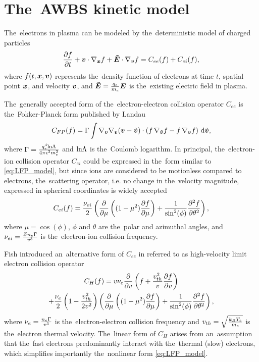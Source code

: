 \section{The~AWBS kinetic model}
\label{sec:AWBSmodel}

The~electrons in plasma can be modeled by the~deterministic model of charged
particles
\begin{equation}
  \frac{\partial{f}}{\partial{t}} + \boldsymbol{v}\cdot\nabla_{\boldsymbol{x}} f + \boldsymbol{\tilde{E}} \cdot\nabla_{\boldsymbol{v}} f = C_{ee}(f) + C_{ei}(f) ,
  \label{eq:kinetic_equation}
\end{equation}
where $f(t, \boldsymbol{x}, \boldsymbol{v})$ represents the~density function of electrons
at time $t$, spatial point $\boldsymbol{x}$, and velocity $\boldsymbol{v}$, and 
$\boldsymbol{\tilde{E}} = \frac{q_e}{m_e}\boldsymbol{E}$ is the~existing electric field in plasma.

The~generally accepted form of the~electron-electron collision operator 
$C_{ee}$ is the~Fokker-Planck form published by Landau \cite{Landau_1936}
\begin{equation}
  C_{FP}(f) =
  \Gamma\int \nabla_{\boldsymbol{v}}\nabla_{\boldsymbol{v}}(\boldsymbol{v} - \tilde{\boldsymbol{v}}) \cdot \left(
  f\, \nabla_{\tilde{\boldsymbol{v}}} f - f\, \nabla_{\boldsymbol{v}} f \right)\, \text{d}\tilde{\boldsymbol{v}} ,
  \label{eq:LFP_model}
\end{equation}
where $\Gamma = \frac{q_e^4\text{ln}\Lambda}{4\pi\epsilon^2m_e^2}$ and 
$\text{ln}\Lambda$ is the~Coulomb logarithm.
In principal, the~electron-ion collision operator $C_{ei}$ could be expressed
in the~form similar to \eqref{eq:LFP_model}, but since ions are considered 
to be motionless compared to electrons, the~scattering operator, i.e.
no change in the~velocity magnitude, expressed in spherical coordinates
is widely accepted
\begin{equation}
  C_{ei}(f) = \frac{\nu_{ei}}{2}
  \left(\frac{\partial{}}{\partial{\mu}}\left((1 - \mu^2)\frac{\partial{f}}{\partial{\mu}}\right)
  + \frac{1}{\sin^2(\phi)}\frac{\partial^2 f}{\partial\theta^2} \right) ,
  \label{eq:ei_scattering}
\end{equation}
where $\mu = \cos(\phi)$, $\phi$ and $\theta$ are the~polar and azimuthal 
angles, and $\nu_{ei} = \frac{Z n_e \Gamma}{v^3}$ is the~electron-ion
collision frequency.

Fish introduced an~alternative form of $C_{ee}$ in \cite{Fish_RMP1987} 
referred to as high-velocity limit electron collision operator
\begin{multline}
  C_{H}(f) = v \nu_{e} \frac{\partial{}}{\partial{v}}\left(f + 
  \frac{v_{th}^2}{v}\frac{\partial{f}}{\partial{v}}\right) \\
  + \frac{\nu_{e}}{2}\left( 1 - \frac{v_{th}^2}{2v^2}\right) 
  \left(\frac{\partial{}}{\partial{\mu}}\left((1 - \mu^2)\frac{\partial{f}}{\partial{\mu}}\right)
  + \frac{1}{\sin^2(\phi)}\frac{\partial^2f}{\partial\theta^2} \right)
  , \label{eq:HighVelocity_model}
\end{multline}
where $\nu_{e} = \frac{n_e \Gamma}{v^3}$ is the~electron-electron collision 
frequency and $v_{th} = \sqrt{\frac{k_B T_e}{m_e}}$ is the~electron thermal 
velocity.
The~linear form of $C_{H}$ arises from an~assumption that the~fast electrons 
predominantly interact with the~thermal (slow) electrons, 
which simplifies importantly the~nonlinear form \eqref{eq:LFP_model}.

